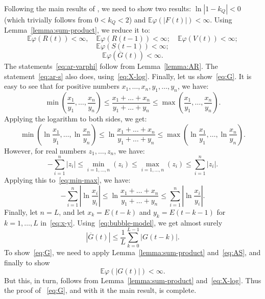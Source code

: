 \documentclass[12pt]{amsart}
\begin{document}
Following the main results of \cite{Brandt0, Brandt}, we need to show two results:
$\ln|1 - k_Q| < 0$ (which trivially follows from $0 < k_Q < 2$) and $\mathbb E\varphi(|F(t)|) < \infty$. Using Lemma~\ref{lemma:sum-product}, we reduce it to:
\begin{equation}
\label{eq:ar-varphi}
\mathbb E\varphi(R(t)) < \infty,\quad \mathbb E\varphi(R(t-1)) < \infty; \quad \mathbb E\varphi(V(t)) < \infty;
\end{equation}
\begin{equation}
\label{eq:ar-s}
\mathbb E\varphi(S(t-1)) < \infty; 
\end{equation}
\begin{equation}
\label{eq:G}
\mathbb E\varphi(\overline{G}(t)) < \infty.
\end{equation} 
The statements~\eqref{eq:ar-varphi} follow from Lemma~\ref{lemma:AR}. The statement~\eqref{eq:ar-s} also does, using~\eqref{eq:X-log}. Finally, let us show~\eqref{eq:G}. It is easy to see that for positive numbers $x_1, \ldots, x_n, y_1, \ldots, y_n$, we have:
$$
 \min\left(\frac{x_1}{y_1}, \ldots, \frac{x_n}{y_n}\right) \le \frac{x_1 + \ldots + x_n}{y_1 + \ldots + y_n} \le \max\left(\frac{x_1}{y_1}, \ldots, \frac{x_n}{y_n}\right).
$$
Applying the logarithm to both sides, we get:
\begin{equation}
\label{eq:min-max}
\min\left(\ln\frac{x_1}{y_1}, \ldots, \ln\frac{x_n}{y_n}\right) \le \ln\frac{x_1 + \ldots + x_n}{y_1 + \ldots + y_n} \le \max\left(\ln\frac{x_1}{y_1}, \ldots, \ln\frac{x_n}{y_n}\right).
\end{equation}
However, for real numbers $z_1, \ldots, z_n$, we have:
$$
-\sum_{i=1}^n|z_i| \le \min\limits_{i = 1, \ldots, n}(z_i) \le \max\limits_{i = 1, \ldots, n}(z_i) \le \sum_{i=1}^n|z_i|.
$$
Applying this to~\eqref{eq:min-max}, we have:
\begin{equation}
\label{eq:x-y}
-\sum_{i=1}^n\left|\ln\frac{x_i}{y_i}\right| \le \ln\frac{x_1+\ldots +x_n}{y_1+\ldots+y_n} \le \sum_{i=1}^n\left|\ln\frac{x_i}{y_i}\right|.
\end{equation}
Finally, let $n = L$, and let $x_k = E(t-k)$ and $y_k = E(t-k-1)$ for $k = 1, \ldots, L$ in~\eqref{eq:x-y}. Using~\eqref{eq:bubble-model}, we get almost surely
\begin{equation}
\label{eq:AS}
|\overline{G}(t)| \le \frac1L\sum\limits_{k=0}^{L-1}|G(t-k)|.
\end{equation}
To show~\eqref{eq:G}, we need to apply Lemma~\ref{lemma:sum-product} and~\eqref{eq:AS}, and finally to show 
$$
\mathbb E\varphi(|G(t)|) < \infty.
$$
But this, in turn, follows from Lemma~\ref{lemma:sum-product} and~\eqref{eq:X-log}.  Thus the proof of ~\eqref{eq:G}, and with it the main result, is complete. 
\end{document}

